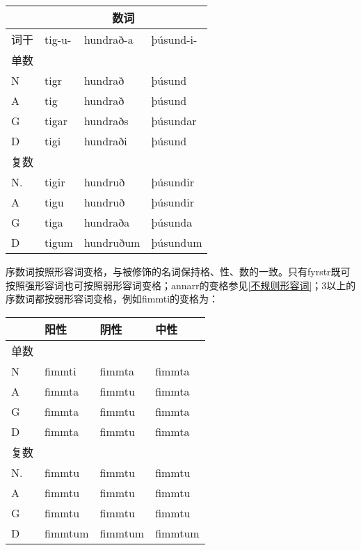 {{\begin{longtable}{llll}
  \toprule
       & \multicolumn{3}{c}{数词}                         \\
  \midrule
  \endhead
  \bottomrule
  \endfoot
  词干 & tig-u-                   & hundrað-a & þúsund-i- \\
  单数 &                          &           &           \\
  N    & tigr                     & hundrað   & þúsund    \\
  A    & tig                      & hundrað   & þúsund    \\
  G    & tigar                    & hundraðs  & þúsundar  \\
  D    & tigi                     & hundraði  & þúsund    \\
  复数 &                          &           &           \\
  N.   & tigir                    & hundruð   & þúsundir  \\
  A    & tigu                     & hundruð   & þúsundir  \\
  G    & tiga                     & hundraða  & þúsunda   \\
  D    & tigum                    & hundruðum & þúsundum  \\
\end{longtable}

序数词按照形容词变格，与被修饰的名词保持格、性、数的一致。只有fyrstr既可按照强形容词也可按照弱形容词变格；annarr的变格参见\ref{不规则形容词}；3以上的序数词都按弱形容词变格，例如fimmti的变格为：

\begin{longtable}{llll}
  \toprule
       & 阳性    & 阴性    & 中性    \\
  \midrule
  \endhead
  \bottomrule
  \endfoot
  单数 &         &         &         \\
  N    & fimmti  & fimmta  & fimmta  \\
  A    & fimmta  & fimmtu  & fimmta  \\
  G    & fimmta  & fimmtu  & fimmta  \\
  D    & fimmta  & fimmtu  & fimmta  \\
  复数 &         &         &         \\
  N.   & fimmtu  & fimmtu  & fimmtu  \\
  A    & fimmtu  & fimmtu  & fimmtu  \\
  G    & fimmtu  & fimmtu  & fimmtu  \\
  D    & fimmtum & fimmtum & fimmtum \\
\end{longtable}

}}
